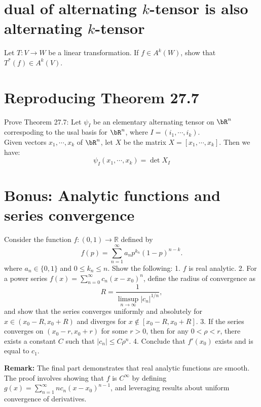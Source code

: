 \documentclass[lang=cn,11pt]{template}
\begin{document}
\section{dual of alternating \(k\)-tensor is also alternating \(k\)-tensor}
Let \( T : V \to W \) be a linear transformation. If \( f \in A^k(W) \), show that \( T^\ast(f) \in A^k(V) \).

\section{Reproducing Theorem 27.7}
Prove Theorem 27.7: Let $\psi_I$ be an elementary alternating tensor on $\bR^n$ correspoding to the usal basis for $\bR^n$, where $I = (i_1, \cdots, i_k)$. \\
Given vectors $x_1, \cdots, x_k$ of $\bR^n$, let $X$ be the matrix $X = [x_1, \cdots, x_k]$. Then we have:
$$
\psi_I (x_1, \cdots, x_k) = \det X_I
$$

\section{Bonus: Analytic functions and series convergence}
Consider the function \( f : (0, 1) \to \mathbb{R} \) defined by
\[
f(p) = \sum_{n=1}^\infty a_n p^{k_n}(1-p)^{n-k}.
\]
where \( a_n \in \{0, 1\} \) and \( 0 \leq k_n \leq n \). Show the following:
1. \( f \) is real analytic.
2. For a power series \( f(x) = \sum_{n=0}^\infty c_n(x-x_0)^n \), define the radius of convergence as
\[
R = \frac{1}{\limsup_{n \to \infty} |c_n|^{1/n}},
\]
and show that the series converges uniformly and absolutely for \( x \in (x_0 - R, x_0 + R) \) and diverges for \( x \not\in [x_0 - R, x_0 + R] \).
3. If the series converges on \( (x_0-r, x_0+r) \) for some \( r > 0 \), then for any \( 0 < \rho < r \), there exists a constant \( C \) such that \( |c_n| \leq C \rho^n \).
4. Conclude that \( f'(x_0) \) exists and is equal to \( c_1 \).

\textbf{Remark:} The final part demonstrates that real analytic functions are smooth. The proof involves showing that \( f \) is \( C^\infty \) by defining \( g(x) = \sum_{n=1}^\infty n c_n (x-x_0)^{n-1} \), and leveraging results about uniform convergence of derivatives.
\end{document}
